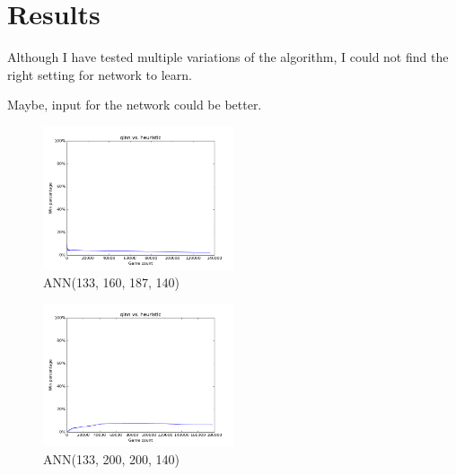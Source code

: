 \chapter{Results}\label{chap:5}

Although I have tested multiple variations of the algorithm, I could not
find the right setting for network to learn.

Maybe, input for the network could
be better.


\graphicspath{{plots/}}

\begin{figure}
  \vspace*{-0.20cm}
  \centering
  \includegraphics[width=0.50\textwidth]{4_133_160_187_140.png}
  \vspace*{-0.60cm}
  \caption{ANN(133, 160, 187, 140)}
  \label{fig:p1}
  \vspace*{-0.00cm}
\end{figure}

\begin{figure}
  \vspace*{-0.00cm}
  \centering
  \includegraphics[width=0.50\textwidth]{4_133_200_200_140.png}
  \vspace*{-0.60cm}
  \caption{ANN(133, 200, 200, 140)}
  \label{fig:p2}
  \vspace*{-0.00cm}
\end{figure}

